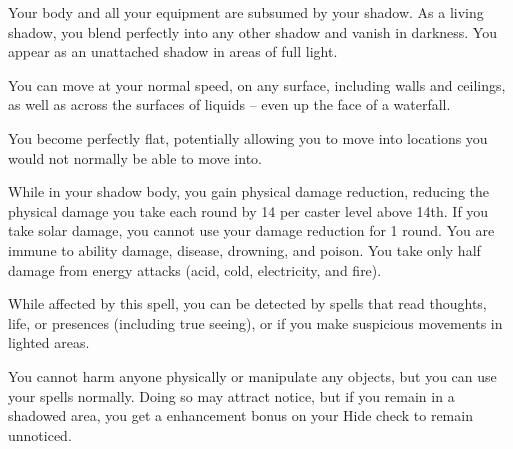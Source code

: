 \begin{spellheader}
    \begin{spelltargetinginfo}
    \end{spelltargetinginfo}
\end{spellheader}
\begin{spellcontent}
    \begin{spelleffects}
        \spelleffect Your body and all your equipment are subsumed by your shadow. As a living shadow, you blend perfectly into any other shadow and vanish in darkness. You appear as an unattached shadow in areas of full light.
        \par You can move at your normal speed, on any surface, including walls and ceilings, as well as across the surfaces of liquids -- even up the face of a waterfall.
        \par You become perfectly flat, potentially allowing you to move into locations you would not normally be able to move into.
        \par While in your shadow body, you gain physical damage reduction, reducing the physical damage you take each round by 14  per caster level above 14th. If you take solar damage, you cannot use your damage reduction for 1 round. You are immune to ability damage, disease, drowning, and poison. You take only half damage from energy attacks (acid, cold, electricity, and fire).
        \par While affected by this spell, you can be detected by spells that read thoughts, life, or presences (including true seeing), or if you make suspicious movements in lighted areas.
        \par You cannot harm anyone physically or manipulate any objects, but you can use your spells normally. Doing so may attract notice, but if you remain in a shadowed area, you get a  enhancement bonus on your Hide check to remain unnoticed.
        \spelldur{\durmed \dismissable}
    \end{spelleffects}
\end{spellcontent}
\begin{spellfooter}

\end{spellfooter}


